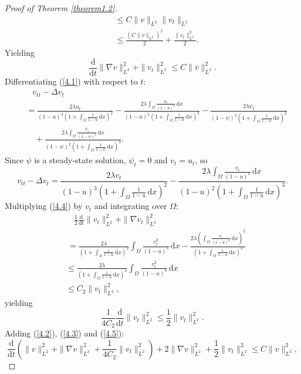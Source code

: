 \documentclass{article}
\numberwithin{equation}{section}
\begin{document}
\begin{proof}[Proof of Theorem \ref{theorem1.2}]
\begin{align*}
    &\ \le C\|v\|_{L^2}\|v_t\|_{L^2}\\
    &\ \le \frac{(C\|v\|_{L^2})^2}{2}+\frac{\|v_t\|_{L^2}^2}{2}.
\end{align*}
Yielding
\begin{equation}
    \frac{\mathrm{d}}{\mathrm{d}t}\|\nabla v\|_{L^2}^2+\|v_t\|_{L^2}^2\le C\|v\|_{L^2}^{2}.\label{4.3}
\end{equation}
Differentiating (\ref{4.1}) with respect to $t$:
\begin{align*}
  &\quad v_{tt}-\Delta v_t\\
  &\ =\frac{2\lambda u_t}{(1-u)^3(1+\int_{\Omega}\frac{1}{1-u}\,\mathrm{d}x)^2}-\frac{2\lambda\int_{\Omega}\frac{u_t}{(1-u)^2}\,\mathrm{d}x}{(1-u)^2(1+\int_{\Omega}\frac{1}{1-u}\,\mathrm{d}x)^3}-\frac{2\lambda \psi_t}{(1-\psi)^3(1+\int_{\Omega}\frac{1}{1-\psi}\,\mathrm{d}x)^2}\\
  &\quad\ +\frac{2\lambda\int_{\Omega}\frac{\psi_t}{(1-\psi)^2}\,\mathrm{d}x}{(1-\psi)^2(1+\int_{\Omega}\frac{1}{1-\psi}\,\mathrm{d}x)^3}.
\end{align*}
Since $\psi$ is a steady-state solution, $\psi_t=0$ and $v_t=u_t$, so
\begin{equation}
    v_{tt}-\Delta v_t=\frac{2\lambda v_t}{(1-u)^3(1+\int_{\Omega}\frac{1}{1-u}\,\mathrm{d}x)^2}-\frac{2\lambda\int_{\Omega}\frac{v_t}{(1-u)^2}\,\mathrm{d}x}{(1-u)^2(1+\int_{\Omega}\frac{1}{1-u}\,\mathrm{d}x)^3}.\label{4.4}
\end{equation}
Multiplying (\ref{4.4}) by $v_t$ and integrating over $\Omega$:
\begin{align*}
    &\quad \frac{1}{2}\frac{\mathrm{d}}{\mathrm{d}t}\|v_t\|_{L^2}^2+\|\nabla v_t\|_{L^2}^2\\
    &\ =\frac{2\lambda}{(1+\int_{\Omega}\frac{1}{1-u}\,\mathrm{d}x)^2}\int_{\Omega}\frac{v_{t}^{2}}{(1-u)^3}\,\mathrm{d}x-\frac{2\lambda(\int_{\Omega}\frac{v_t}{(1-u)^2}\,\mathrm{d}x)^2}{(1+\int_{\Omega}\frac{1}{1-u}\,\mathrm{d}x)^3}\\
    &\le \frac{2\lambda}{(1+\int_{\Omega}\frac{1}{1-u}\,\mathrm{d}x)^2}\int_{\Omega}\frac{v_{t}^{2}}{(1-u)^3}\,\mathrm{d}x\\
    &\le C_2\|v_t\|_{L^2}^{2},
\end{align*}
yielding
\begin{equation}
    \frac{1}{4C_2}\frac{\mathrm{d}}{\mathrm{d}t}\|v_t\|_{L^2}^2\le \frac{1}{2}\|v_t\|_{L^2}^{2}.\label{4.5}
\end{equation}
Adding (\ref{4.2}), (\ref{4.3}) and (\ref{4.5}):
$$\frac{\mathrm{d}}{\mathrm{d}t}\left(\|v\|_{L^2}^2+\|\nabla v\|_{L^2}^2+\frac{1}{4C_2}\|v_t\|_{L^2}^2\right)+2\|\nabla v\|_{L^2}^2+\frac{1}{2}\|v_t\|_{L^2}^2\le C\|v\|_{L^2}^{2},$$

\end{proof}
\end{document}
